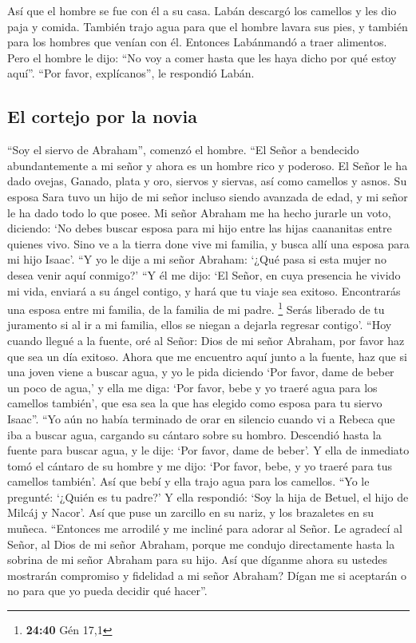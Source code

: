  Así que el hombre se fue con él a su casa. Labán
descargó los camellos y les dio paja y comida. También trajo agua para
que el hombre lavara sus pies, y también para los hombres que venían con
él.  Entonces Labánmandó a traer alimentos. Pero el
hombre le dijo: ``No voy a comer hasta que les haya dicho por qué estoy
aquí''. ``Por favor, explícanos'', le respondió Labán.

\hypertarget{el-cortejo-por-la-novia}{%
\subsection{El cortejo por la novia}\label{el-cortejo-por-la-novia}}

 ``Soy el siervo de Abraham'', comenzó el hombre.
 ``El Señor a bendecido abundantemente a mi señor y ahora
es un hombre rico y poderoso. El Señor le ha dado ovejas, Ganado, plata
y oro, siervos y siervas, así como camellos y asnos.  Su
esposa Sara tuvo un hijo de mi señor incluso siendo avanzada de edad, y
mi señor le ha dado todo lo que posee.  Mi señor Abraham
me ha hecho jurarle un voto, diciendo: `No debes buscar esposa para mi
hijo entre las hijas caananitas entre quienes vivo.  Sino
ve a la tierra done vive mi familia, y busca allí una esposa para mi
hijo Isaac'.  ``Y yo le dije a mi señor Abraham: `¿Qué
pasa si esta mujer no desea venir aquí conmigo?'  ``Y él
me dijo: `El Señor, en cuya presencia he vivido mi vida, enviará a su
ángel contigo, y hará que tu viaje sea exitoso. Encontrarás una esposa
entre mi familia, de la familia de mi padre. \footnote{\textbf{24:40}
  Gén 17,1}  Serás liberado de tu juramento si al ir a mi
familia, ellos se niegan a dejarla regresar contigo'. 
``Hoy cuando llegué a la fuente, oré al Señor: Dios de mi señor Abraham,
por favor haz que sea un día exitoso.  Ahora que me
encuentro aquí junto a la fuente, haz que si una joven viene a buscar
agua, y yo le pida diciendo `Por favor, dame de beber un poco de agua,'
 y ella me diga: `Por favor, bebe y yo traeré agua para
los camellos también', que esa sea la que has elegido como esposa para
tu siervo Isaac''.  ``Yo aún no había terminado de orar
en silencio cuando vi a Rebeca que iba a buscar agua, cargando su
cántaro sobre su hombro. Descendió hasta la fuente para buscar agua, y
le dije: `Por favor, dame de beber'.  Y ella de inmediato
tomó el cántaro de su hombre y me dijo: `Por favor, bebe, y yo traeré
para tus camellos también'. Así que bebí y ella trajo agua para los
camellos.  ``Yo le pregunté: `¿Quién es tu padre?' Y ella
respondió: `Soy la hija de Betuel, el hijo de Milcáj y Nacor'. Así que
puse un zarcillo en su nariz, y los brazaletes en su muñeca.
 ``Entonces me arrodilé y me incliné para adorar al
Señor. Le agradecí al Señor, al Dios de mi señor Abraham, porque me
condujo directamente hasta la sobrina de mi señor Abraham para su hijo.
 Así que díganme ahora su ustedes mostrarán compromiso y
fidelidad a mi señor Abraham? Dígan me si aceptarán o no para que yo
pueda decidir qué hacer''.

